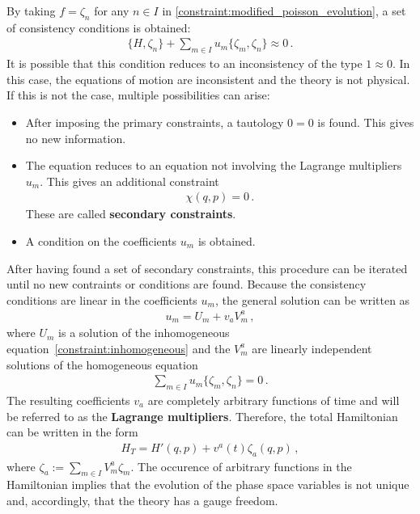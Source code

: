     \begin{property}
        By taking $f=\zeta_n$ for any $n\in I$ in \cref{constraint:modified_poisson_evolution}, a set of consistency conditions is obtained:
        \begin{gather}
            \label{constraint:inhomogeneous}
            \{H,\zeta_n\} + \sum_{m\in I}u_m\{\zeta_m,\zeta_n\}\approx 0\,.
        \end{gather}
        It is possible that this condition reduces to an inconsistency of the type $1\approx0$. In this case, the equations of motion are inconsistent and the theory is not physical. If this is not the case, multiple possibilities can arise:
        \begin{itemize}
            \item After imposing the primary constraints, a tautology $0=0$ is found. This gives no new information.
            \item The equation reduces to an equation not involving the Lagrange multipliers $u_m$. This gives an additional constraint
                \begin{gather}
                    \chi(q,p)=0\,.
                \end{gather}
                These are called \textbf{secondary constraints}.
            \item A condition on the coefficients $u_m$ is obtained.
        \end{itemize}
        After having found a set of secondary constraints, this procedure can be iterated until no new contraints or conditions are found. Because the consistency conditions are linear in the coefficients $u_m$, the general solution can be written as
        \begin{gather}
            u_m = U_m + v_aV^a _m\,,
        \end{gather}
        where $U_m$ is a solution of the inhomogeneous equation~\eqref{constraint:inhomogeneous} and the $V^a_m$ are linearly independent solutions of the homogeneous equation
        \begin{gather}
            \sum_{m\in I}u_m\{\zeta_m,\zeta_n\} = 0\,.
        \end{gather}
        The resulting coefficients $v_a$ are completely arbitrary functions of time and will be referred to as the \textbf{Lagrange multipliers}. Therefore, the total Hamiltonian can be written in the form
        \begin{gather}
            H_T = H'(q,p) + v^a(t)\zeta_a(q,p)\,,
        \end{gather}
        where $\zeta_a := \sum_{m\in I}V^a_m\zeta_m$. The occurence of arbitrary functions in the Hamiltonian implies that the evolution of the phase space variables is not unique and, accordingly, that the theory has a gauge freedom.
    \end{property}

